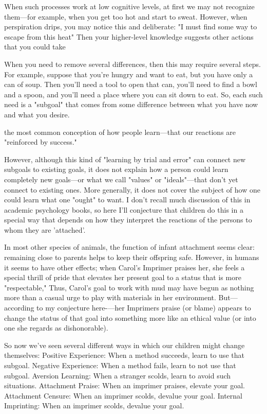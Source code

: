 \documentclass[10pt,a4paper]{article}
\begin{document}
When such processes work at low cognitive levels, at first we may not recognize them—for example, when you get too hot and start to sweat. However, when perspiration drips, you may notice this and deliberate: "I must find some way to escape from this heat" Then your higher-level knowledge suggests other actions that you could take \cite[p.~41]{minsky}

When you need to remove several differences, then this may require several steps. For example, suppose that you're hungry and want to eat, but you have only a can of soup. Then you'll need a tool to open that can, you'll need to find a bowl and a spoon, and you'll need a place where you can sit down to eat. So, each such need is a "subgoal" that comes from some difference between what you have now and what you desire. \cite[p.~42]{minsky}

the most common conception of how people learn—that our reactions are "reinforced by success." \cite[p.~43]{minsky}

However, although this kind of "learning by trial and error" can connect new subgoals to existing goals, it does not explain how a person could learn completely new goals—or what we call "values" or "ideals"—that don't yet connect to existing ones. More generally, it does not cover the subject of how one could learn what one "ought" to want. I don't recall much discussion of this in academic psychology books, so here I'll conjecture that children do this in a special way that depends on how they interpret the reactions of the persons to whom they are 'attached'. \cite[p.~43-44]{minsky}

In most other species of animals, the function of infant attachment seems clear: remaining close to parents helps to keep their offspring safe. However, in humans it seems to have other effects; when Carol's Imprimer praises her, she feels a special thrill of pride that elevates her present goal to a status that is more "respectable," Thus, Carol's goal to work with mud may have begun as nothing more than a casual urge to play with materials in her environment. But—according to my conjecture here-—her Imprimers praise (or blame) appears to change the status of that goal into something more like an ethical value (or into one she regards as dishonorable). \cite[p.~44-45]{minsky}

So now we've seen several different ways in which our children might change themselves:
Positive Experience: When a method succeeds, learn to use that subgoal.
Negative Experience: When a method fails, learn to not use that
subgoal.
Aversion Learning: When a stranger scolds, learn to avoid such
situations.
Attachment Praise: When an imprimer praises, elevate your goal.
Attachment Censure: When an imprimer scolds, devalue your goal.
Internal Imprinting: When an imprimer scolds, devalue your goal.
\cite[p.~44-46]{minsky}
\end{document}
